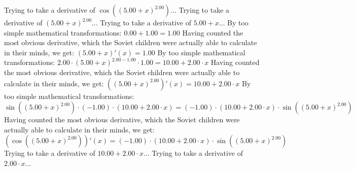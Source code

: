 \documentclass{article}
\begin{document}
Trying to take a derivative of $ \cos {\left({\left({{5.00} + {x}}\right) ^ {2.00}}\right)} $...\newline
\newline
Trying to take a derivative of ${\left({{5.00} + {x}}\right) ^ {2.00}}$...\newline
\newline
Trying to take a derivative of ${{5.00} + {x}}$...\newline
\newline
By too simple mathematical transformations:
 ${{0.00} + {1.00}} = {1.00}$ 
 \newline
 \newline 
Having counted the most obvious derivative, which the Soviet children were actually able to calculate in their minds, we get:
$({{5.00} + {x}})'(x) = {1.00}$\newline
\newline
By too simple mathematical transformations:
 ${{{2.00} \cdot {\left({{5.00} + {x}}\right) ^ {{2.00} - {1.00}}}} \cdot {1.00}} = {{10.00} + {{2.00} \cdot {x}}}$ 
 \newline
 \newline 
Having counted the most obvious derivative, which the Soviet children were actually able to calculate in their minds, we get:
$({\left({{5.00} + {x}}\right) ^ {2.00}})'(x) = {{10.00} + {{2.00} \cdot {x}}}$\newline
\newline
By too simple mathematical transformations:
 ${{ \sin {\left({\left({{5.00} + {x}}\right) ^ {2.00}}\right)}  \cdot \left({-1.00}\right)} \cdot \left({{10.00} + {{2.00} \cdot {x}}}\right)} = {\left({-1.00}\right) \cdot {\left({{10.00} + {{2.00} \cdot {x}}}\right) \cdot  \sin {\left({\left({{5.00} + {x}}\right) ^ {2.00}}\right)} }}$ 
 \newline
 \newline 
Having counted the most obvious derivative, which the Soviet children were actually able to calculate in their minds, we get:
$( \cos {\left({\left({{5.00} + {x}}\right) ^ {2.00}}\right)} )'(x) = {\left({-1.00}\right) \cdot {\left({{10.00} + {{2.00} \cdot {x}}}\right) \cdot  \sin {\left({\left({{5.00} + {x}}\right) ^ {2.00}}\right)} }}$\newline
\newline
Trying to take a derivative of ${{10.00} + {{2.00} \cdot {x}}}$...\newline
\newline
Trying to take a derivative of ${{2.00} \cdot {x}}$...\newline
\end{document}
